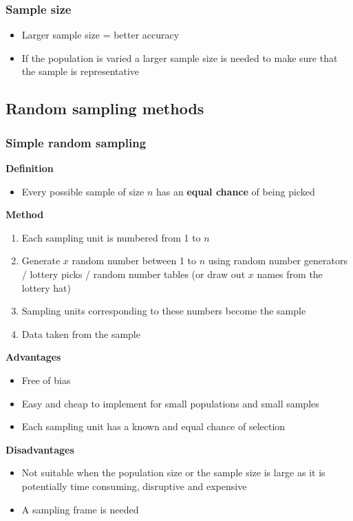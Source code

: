 \documentclass[fleqn, 11pt]{article}
\begin{document}
	\subsubsection{Sample size}
	\begin{itemize}
		\item Larger sample size = better accuracy
		\item If the population is varied a larger sample size is needed to make sure that the sample is representative
	\end{itemize}
	
	
	\subsection{Random sampling methods}
	\subsubsection{Simple random sampling}
	\textbf{Definition}
	\begin{itemize}
		\item Every possible sample of size $n$ has an \textbf{equal chance} of being picked
	\end{itemize}
	\textbf{Method}
	\begin{enumerate}
		\item Each sampling unit is numbered from 1 to $n$
		\item Generate $x$ random number between 1 to $n$ using random number generators / lottery picks / random number tables (or draw out $x$ names from the lottery hat)
		\item Sampling units corresponding to these numbers become the sample
		\item Data taken from the sample
	\end{enumerate}
	\textbf{Advantages}
	\begin{itemize}
		\item Free of bias
		\item Easy and cheap to implement for small populations and small samples
		\item Each sampling unit has a known and equal chance of selection
	\end{itemize}
	\textbf{Disadvantages}
	\begin{itemize}
		\item Not suitable when the population size or the sample size is large as it is potentially time consuming, disruptive and expensive
		\item A sampling frame is needed
	\end{itemize}
\end{document}
